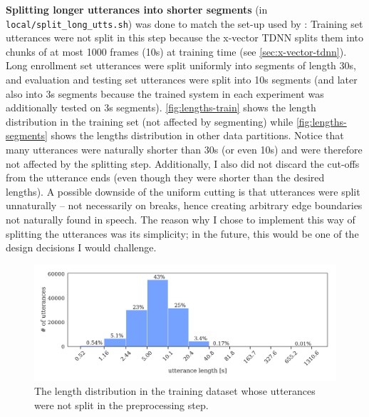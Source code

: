 \documentclass[bsc,frontabs,twoside,singlespacing,parskip,deptreport]{infthesis}
\begin{document}
{{    %
    \textbf{Splitting longer utterances into shorter segments} (in \verb|local/split_long_utts.sh|) was done to match the set-up used by \citet{Snyder_et_al_2018}: Training set utterances were not split in this step because the x-vector TDNN splits them into chunks of at most 1000 frames (10s) at training time (see \autoref{sec:x-vector-tdnn}). Long enrollment set utterances were split uniformly into segments of length 30s, and evaluation and testing set utterances were split into 10s segments (and later also into 3s segments because the trained system in each experiment was additionally tested on 3s segments). \autoref{fig:lengths-train} shows the length distribution in the training set (not affected by segmenting) while \autoref{fig:lengths-segments} shows the lengths distribution in other data partitions. Notice that many utterances were naturally shorter than 30s (or even 10s) and were therefore not affected by the splitting step. Additionally, I also did not discard the cut-offs from the utterance ends (even though they were shorter than the desired lengths). A possible downside of the uniform cutting is that utterances were split unnaturally -- not necessarily on breaks, hence creating arbitrary edge boundaries not naturally found in speech. The reason why I chose to implement this way of splitting the utterances was its simplicity; in the future, this would be one of the design decisions I would challenge.
    \begin{figure}[h!t]
      \centering
      \includegraphics[width=13cm]{../img/lengths-train.pdf}
      \caption{The length distribution in the training dataset whose utterances were not split in the preprocessing step.}
      \label{fig:lengths-train}
    \end{figure}
    \begin{figure}[h!t]
      \centering

\end{figure}}}
\end{document}
